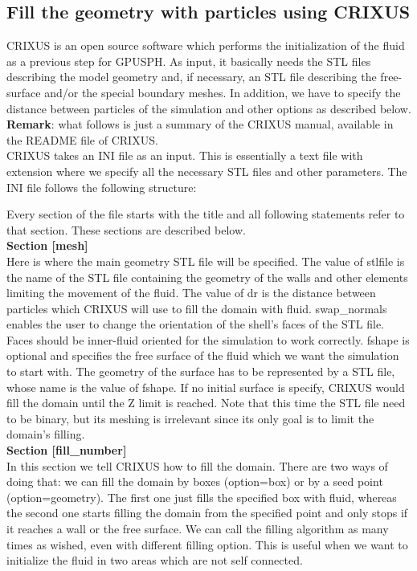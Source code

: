 \documentclass[12pt]{memoir}
\begin{document}
\subsection{Fill the geometry with particles using CRIXUS}

CRIXUS is an open source software which performs the initialization 
of the fluid as a previous step for GPUSPH. 
As input, it basically needs the STL files describing the model geometry 
and, if necessary, an STL file describing the free-surface and/or the special 
boundary meshes. 
In addition, we have to specify the distance between particles 
of the simulation and other options as described below.\\

\textbf{Remark}: what follows is just a summary of the CRIXUS manual, 
available in the README file of CRIXUS.\\

CRIXUS takes an INI file as an input. 
This is essentially a text file with  extension 
where we specify all the necessary STL files and other parameters.
The INI file follows the following structure:


Every section of the file starts with the title \cmd{[XXX]} 
and all following statements refer to that section.
These sections are described below.\\

\textbf{Section [mesh]}\\
Here is where the main geometry STL file will be specified. 
The value of stlfile is the name of the STL file containing 
the geometry of the walls and other elements limiting 
the movement of the fluid. 
The value of dr is the distance between particles 
which CRIXUS will use to fill the domain with fluid.
swap_normals enables the user to change the orientation 
of the shell’s faces of the STL file. Faces should be 
inner-fluid oriented for the simulation to work correctly.
fshape is optional and specifies the free surface of 
the fluid which we want the simulation to start with. 
The geometry of the surface has to be represented by a STL file, 
whose name is the value of fshape. If no initial surface is 
specify, CRIXUS would fill the domain until the Z limit 
is reached. Note that this time the STL file need to be binary, 
but its meshing is irrelevant since its only goal 
is to limit the domain’s filling.\\

\textbf{Section [fill\_number]}\\
In this section we tell CRIXUS how to fill the domain. 
There are two ways of doing that: we can fill the domain by boxes 
(option=box) or by a seed point (option=geometry).  The first one 
just fills the specified box with fluid, whereas the second 
one starts filling the domain from the specified point 
and only stops if it reaches a wall or the free surface. 
We can call the filling algorithm as many times as wished, 
even with different filling option. 
This is useful when we want to initialize the fluid 
in two areas which are not self connected. \\
\end{document}
